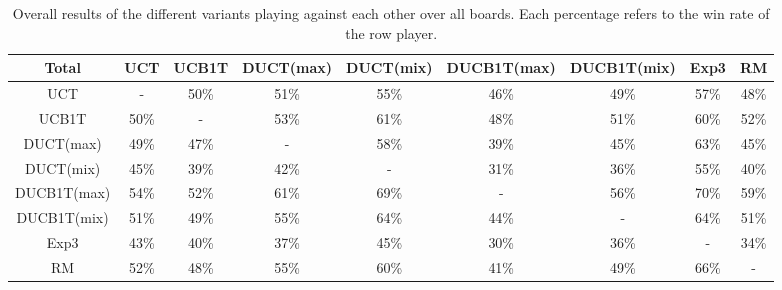 \documentclass{article}
\begin{document}
\begin{table}[h!]\scriptsize
\centering
\begin{tabular}{|c||c|c|c|c|c|c|c|c|}
									\hline
  Total 	     	& UCT 	& UCB1T		& DUCT(max)	& DUCT(mix)	& DUCB1T(max)	& DUCB1T(mix)	& Exp3	& RM				\\ 	
  \hline
  \hline
   UCT &    - & 50\% & 51\% & 55\% & 46\% & 49\% & 57\% & 48\% \\ \hline 
 UCB1T & 50\% &    - & 53\% & 61\% & 48\% & 51\% & 60\% & 52\% \\ \hline 
   DUCT(max) & 49\% & 47\% &    - & 58\% & 39\% & 45\% & 63\% & 45\% \\ \hline 
   DUCT(mix) & 45\% & 39\% & 42\% &    - & 31\% & 36\% & 55\% & 40\% \\ \hline 
 DUCB1T(max) & 54\% & 52\% & 61\% & 69\% &    - & 56\% & 70\% & 59\% \\ \hline 
 DUCB1T(mix) & 51\% & 49\% & 55\% & 64\% & 44\% &    - & 64\% & 51\% \\ \hline 
      Exp3 & 43\% & 40\% & 37\% & 45\% & 30\% & 36\% &    - & 34\% \\ \hline 
        RM & 52\% & 48\% & 55\% & 60\% & 41\% & 49\% & 66\% &    - \\ \hline 
\end{tabular}
\caption{Overall results of the different variants playing against each other over all boards.
Each percentage refers to the win rate of the row player. }
\label{table:round_robin_total}
\end{table}
\end{document}
